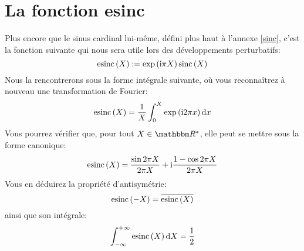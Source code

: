 \section{La fonction esinc}

Plus encore que le sinus cardinal lui-même, défini plus haut à l'annexe \ref{sinc},
c'est la fonction suivante qui nous sera utile lors des développements perturbatifs:
\begin{equation*}
\mathrm{esinc} \left( {X} \right) := \mathrm{exp} \left( {\mathrm{i} \pi X} \right) \mathrm{sinc} \left( {X} \right)
\end{equation*}
Nous la rencontrerons sous la forme intégrale suivante, où vous reconnaîtrez à nouveau une transformation de Fourier:
\begin{equation*}
\mathrm{esinc} \left( {X} \right) = \frac 1 X \int_0^X \mathrm{exp} \left( {\mathrm{i} 2 \pi x} \right) \mathrm dx
\end{equation*}
Vous pourrez vérifier que, pour tout $X \in \IR^*$, elle peut se mettre sous la forme canonique:
\begin{equation*}
\mathrm{esinc} \left( {X} \right) = \frac{\sin{2 \pi X}}{2 \pi X} + \mathrm{i} \frac{1 - \cos{2 \pi X}}{2 \pi X}
\end{equation*}
Vous en déduirez la propriété d'antisymétrie:
\begin{equation*}
\mathrm{esinc} \left( {-X} \right) = \overline{\mathrm{esinc} \left( {X} \right)}
\end{equation*}
ainsi que son intégrale:
\begin{equation*}
\int_{-\infty}^{+\infty} \mathrm{esinc} \left( {X} \right) \mathrm dX = \frac 1 2
\end{equation*}
